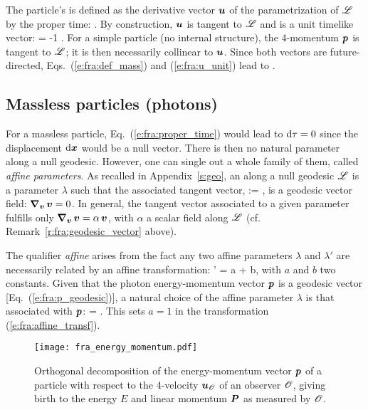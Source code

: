 The particle's  is defined as the
derivative vector $\bm{u}$ of the parametrization of
$\mathscr{L}$ by the proper time:
\be \label{e:fra:def_u}
    .
\ee
By construction, $\bm{u}$ is tangent to $\mathscr{L}$ and is a unit timelike vector:
\be \label{e:fra:u_unit}
    \cdot{} = -1 .
\ee
For a simple particle (no internal structure),
the 4-momentum $\bm{p}$ is tangent to $\mathscr{L}$; it is then necessarily
collinear to $\bm{u}$. Since both vectors are future-directed,
Eqs.~(\ref{e:fra:def_mass}) and (\ref{e:fra:u_unit}) lead to
\be \label{e:fra:p_m_u}
   .
\ee

\subsection{Massless particles (photons)}

For a massless particle, Eq.~(\ref{e:fra:proper_time}) would lead to $\mathrm{d}\tau=0$
since the displacement $\mathrm{d}\bm{x}$ would be a null vector. There is then no natural parameter
along a null geodesic. However, one can single out a whole family of them,
called \emph{affine parameters}.
As recalled in Appendix~\ref{s:geo},
an 
along a null geodesic $\mathscr{L}$ is a parameter $\lambda$ such that
the associated tangent vector,
\be
     :=  ,
\ee
is a geodesic vector field: $\bm{\nabla}_{\bm{v}} \, \bm{v} = 0$. In general,
the tangent vector associated to a given parameter fulfills only
$\bm{\nabla}_{\bm{v}} \, \bm{v} = \alpha \, \bm{v}$, with $\alpha$ a scalar field
along $\mathscr{L}$ (cf. Remark~\ref{r:fra:geodesic_vector} above).

The qualifier \emph{affine} arises from the fact any two affine parameters
$\lambda$ and $\lambda'$ are necessarily related by an affine transformation:
\be \label{e:fra:affine_transf}
    \lambda' = a \lambda + b,
\ee
with $a$ and $b$ two constants.
Given that the photon energy-momentum vector $\bm{p}$ is a geodesic vector
[Eq.~(\ref{e:fra:p_geodesic})],
a natural choice of the affine parameter $\lambda$ is that associated with
$\bm{p}$:
\be \label{e:fra:p_dxdl}
     =  .
\ee
This sets $a=1$ in the transformation (\ref{e:fra:affine_transf}).


\begin{figure}
\centerline{\texttt{[image: fra\_energy\_momentum.pdf]}}
\caption[]{\label{f:fra:energy_momentum} \footnotesize
Orthogonal decomposition of the energy-momentum vector $\bm{p}$ of a particle
with respect to the 4-velocity $\bm{u}_{\mathscr{O}}$ of an observer $\mathscr{O}$,
giving birth to the energy $E$ and linear momentum $\bm{P}$ as measured by $\mathscr{O}$.}
\end{figure}



